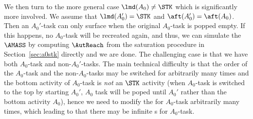 We then turn to the more general case $\lmd(A_0)\neq\STK$ which is significantly more involved. We assume that $\lmd(A_0')=\STK$ and $\aft(A_0') = \aft(A_0)$. Then an $A_0'$-task can only surface when the original $A_0$-task is popped empty. If this happens, no $A_0$-task will be recreated again, and thus, we can simulate the $\AMASS$ by computing $\AutReach$ from the saturation procedure in Section~\ref{sec:a0stk} directly and we are done. The challenging case is that we have both $A_0$-task and non-$A_0'$-tasks. 
The main technical difficulty is that the order of the $A_0$-task and the non-$A_0$-tasks may be switched for arbitrarily many times and the bottom activity of $A_0$-task is \emph{not} an $\STK$ activity (when $A_0$-task is switched to the top by starting $A_0'$, $A_0$ task will be poped until $A_0'$ rather than the bottom activity $A_0$), hence we need to modify the {\WOTrNFA} for $A_0$-task arbitrarily many times, which leading to that there may be infinite {\WOTrNFA}s for $A_0$-task.

